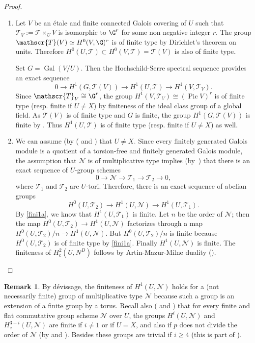\documentclass[10pt,a4paper]{amsart}
\newcommand{\resp}{resp.\xspace}
\newcommand{\skpt}{\smallskip}
\let\mathcal\mathscr
\newenvironment{enumeratea}
{\bgroup\def\theenumi{\alph{enumi}}\begin{enumerate}}
{\end{enumerate}\egroup}
\newcommand{\rc}{\mathrm{c}}
\theoremstyle{plain}
\theoremstyle{definition}
\newtheorem{rema}[theo]{Remark}
\DeclareMathOperator \pic {Pic}
\DeclareMathOperator \gal {Gal}
\newcommand\cN {\mathcal{N}}
\newcommand \cT {\mathcal{T}}
\begin{document}
\skpt\begin{proof}
\begin{enumeratea}
\item
Let $V$ be an étale and finite connected
Galois covering of $U$ such that $\cT_V:=\cT \times_U V$
is isomorphic to $\G^r$ for some non negative integer $r$.
The group $\cT(V) \simeq
H^0(V,\G)^r$ is of finite type by Dirichlet's theorem on units. Therefore
$H^0(U,\cT) \subset H^0(V,\cT)=\cT(V)$
is also of finite type.

Set $G=\gal(V/U)$. Then the Hochschild-Serre spectral sequence provides an
exact sequence
\[
0 \to H^1(G,\cT(V)) \to H^1(U,\cT)
\to H^1(V,\cT_V).
\]
Since $\cT_V \cong \G^r$, the group
$H^1(V,\cT_V) \cong (\pic V)^r$ is of finite type
(\resp finite if $U \neq X$) by finiteness of the ideal class group
of a global field.
As $\cT(V)$ is of finite type and $G$ is finite, the group
$H^1(G,\cT(V))$ is finite by \cite[Chap.\,VIII, Cor.\,2]{col}.
Thus $H^1(U,\cT)$ is of
finite type (\resp finite if $U \neq X$) as well.

\item
We can assume (by (\cite[Lem.\,III.8.9]{MilADT}
and \cite[Cor.\,4.9]{DemH}) that $U \neq X$.
Since every finitely generated Galois module is a quotient of a
torsion-free and finitely generated Galois module, the
assumption that $\cN$ is of multiplicative type implies
(by~\cite[X, Prop.\,1.1]{sga3})
that there is an exact sequence of $U$-group schemes
\[
0 \to \cN \to \cT_1 \to \cT_2 \to 0,
\]
where $\cT_1$ and $\cT_2$ are $U$-tori. Therefore, there is
an exact sequence of abelian groups
\[
H^0(U,\cT_2) \to H^1(U, \cN) \to H^1(U, \cT_1).
\]
By \eqref{fini1a}, we know that $H^1(U, \cT_1)$ is finite. Let $n$ be the order
of $\cN$; then the map $H^0(U,\cT_2) \to H^1(U, \cN)$
factorizes through a map $H^0(U,\cT_2)/n \to H^1(U, \cN)$.
But $H^0(U,\cT_2)/n$ is finite because $H^0(U,\cT_2)$
is of finite type by \eqref{fini1a}. Finally $H^1(U, \cN)$ is finite. The
finiteness of $H^2_\rc(U,N^D)$ follows by Artin-Mazur-Milne
duality (\cite[Th.\,1.1]{DemH}).\qedhere
\end{enumeratea}
\end{proof}

\begin{rema} \label{fini2}
By dévissage, the finiteness of $H^1(U, \cN)$ holds for
a (not necessarily finite)
group of multiplicative type $\cN$
because such a group is an extension of
a finite group by a torus. Recall also (\cite[Lem.\,III.8.9]{MilADT}
and \cite[Cor.\,4.8]{DemH})
that for every finite and flat commutative
group scheme $\cN$ over $U$, the groups $H^i(U,\cN)$ and
$H^{3-i}_\rc(U,\cN)$ are finite if $i \neq 1$ or if $U=X$, and
also if $p$ does not divide the order of $\cN$ (by \cite[Prop.\,2.1\,(4)]{DemH} and \cite[Th.\,II.3.1]{MilADT}).
Besides these groups are trivial if $i \geq 4$ (this is part of \cite[Th.\,1.1]{DemH}).
\end{rema}
\end{document}
